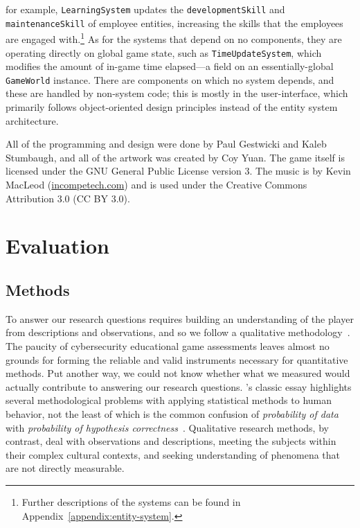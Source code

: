 \documentclass[letterpaper]{article}
\begin{document}
for example, \texttt{LearningSystem} updates the
\texttt{developmentSkill} and \texttt{maintenanceSkill} of employee
entities, increasing the skills that the employees are engaged
with.\footnote{Further descriptions of the systems can be found in
  Appendix~\ref{appendix:entity-system}.}  As for the systems that
depend on no components, they are operating directly on global game
state, such as \texttt{TimeUpdateSystem}, which modifies the amount of
in-game time elapsed---a field on an essentially-global
\texttt{GameWorld} instance.
There are components on which no system depends, and these are handled
by non-system code; this is mostly in the user-interface, which primarily
follows object-oriented design principles instead of the entity
system architecture.

All of the programming and design were done by Paul Gestwicki and
Kaleb Stumbaugh, and all of the artwork was created by Coy Yuan.  
The game itself is licensed under the GNU General Public License
version 3.
The
music is by Kevin MacLeod (\url{incompetech.com}) and is used under the
Creative Commons Attribution 3.0 (CC BY 3.0).


\section{Evaluation}
\label{sec:evaluation}

\subsection{Methods}

To answer our research questions requires building an understanding of
the player from descriptions and observations, and so we follow a
qualitative methodology~\citep[see][for example]{Stake2010}.  The
paucity of cybersecurity educational game assessments leaves almost no
grounds for forming the reliable and valid instruments necessary for
quantitative methods. Put another way, we could not know whether what
we measured would actually contribute to answering our research
questions.  \citeauthor{Cohen1994}'s classic essay highlights several
methodological problems with applying statistical methods to human
behavior, not the least of which is the common confusion of
\textit{probability of data} with \textit{probability of hypothesis
  correctness}~\citep{Cohen1994}.
Qualitative research methods, by contrast, deal with 
observations and descriptions, meeting the subjects within their
complex cultural contexts, and seeking understanding of phenomena
that are not directly measurable. 
\end{document}
